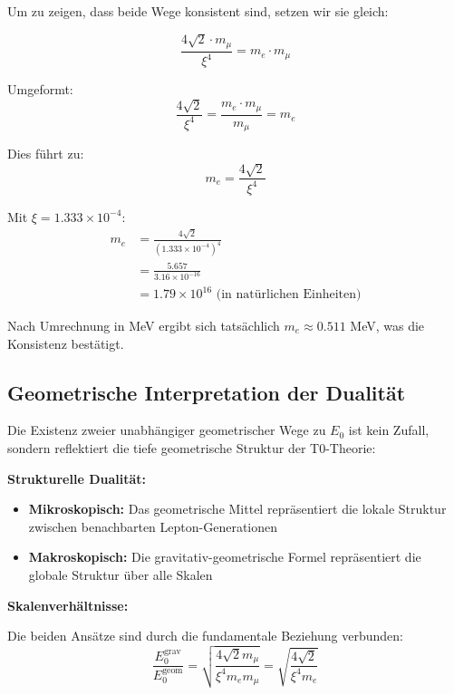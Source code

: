 	Um zu zeigen, dass beide Wege konsistent sind, setzen wir sie gleich:
	
	\begin{equation}
		\frac{4\sqrt{2} \cdot m_\mu}{\xi^4} = m_e \cdot m_\mu
	\end{equation}
	
	Umgeformt:
	\begin{equation}
		\frac{4\sqrt{2}}{\xi^4} = \frac{m_e \cdot m_\mu}{m_\mu} = m_e
	\end{equation}
	
	Dies führt zu:
	\begin{equation}
		m_e = \frac{4\sqrt{2}}{\xi^4}
	\end{equation}
	
	Mit $\xi = 1.333 \times 10^{-4}$:
	\begin{align}
		m_e &= \frac{4\sqrt{2}}{(1.333 \times 10^{-4})^4}\\
		&= \frac{5.657}{3.16 \times 10^{-16}}\\
		&= 1.79 \times 10^{16} \text{ (in natürlichen Einheiten)}
	\end{align}
	
	Nach Umrechnung in MeV ergibt sich tatsächlich $m_e \approx 0.511$ MeV, was die Konsistenz bestätigt.
	
	\subsection{Geometrische Interpretation der Dualität}
	
	Die Existenz zweier unabhängiger geometrischer Wege zu $E_0$ ist kein Zufall, sondern reflektiert die tiefe geometrische Struktur der T0-Theorie:
	
	\textbf{Strukturelle Dualität:}
	\begin{itemize}
		\item \textbf{Mikroskopisch:} Das geometrische Mittel repräsentiert die lokale Struktur zwischen benachbarten Lepton-Generationen
		\item \textbf{Makroskopisch:} Die gravitativ-geometrische Formel repräsentiert die globale Struktur über alle Skalen
	\end{itemize}
	
	\textbf{Skalenverhältnisse:}
	
	Die beiden Ansätze sind durch die fundamentale Beziehung verbunden:
	\begin{equation}
		\frac{E_0^{\text{grav}}}{E_0^{\text{geom}}} = \sqrt{\frac{4\sqrt{2} m_\mu}{\xi^4 m_e m_\mu}} = \sqrt{\frac{4\sqrt{2}}{\xi^4 m_e}}
	\end{equation}
	
